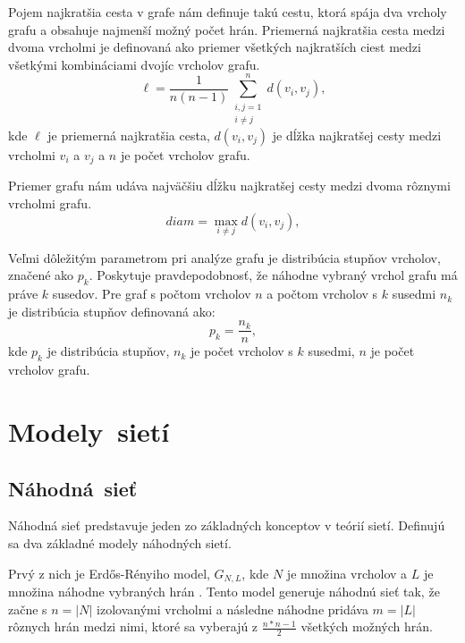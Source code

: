 Pojem najkratšia cesta v grafe nám definuje takú cestu, ktorá spája dva vrcholy grafu a obsahuje najmenší možný počet
hrán. Priemerná najkratšia cesta medzi dvoma vrcholmi je definovaná ako priemer všetkých najkratších ciest medzi
všetkými kombináciami dvojíc vrcholov grafu.	
\begin{equation}
    \ell = \frac{1}{n(n - 1)} \sum_{\substack{i,j = 1 \\ i \ne j}}^{n} d(v_i, v_j),
    \label{eq:avg_shortest_path}
\end{equation}
kde $\ell$ je priemerná najkratšia cesta, $d(v_i, v_j)$ je dĺžka najkratšej cesty medzi vrcholmi $v_i$ a $v_j$ a $n$ je počet vrcholov grafu\cite{barabasi2016network}.

Priemer grafu nám udáva najväčšiu dĺžku najkratšej cesty medzi dvoma rôznymi vrcholmi grafu.
\begin{equation}
    diam = \max_{i \ne j} d(v_i, v_j),
    \label{eq:diameter}
\end{equation}

Veľmi dôležitým parametrom pri analýze grafu je distribúcia stupňov vrcholov, značené ako $p_k$.
Poskytuje pravdepodobnosť, že náhodne vybraný vrchol grafu má práve $k$ susedov\cite{barabasi2016network}.
Pre graf s počtom vrcholov $n$ a počtom vrcholov s $k$ susedmi $n_k$ je distribúcia stupňov definovaná ako:
\begin{equation}
    p_k = \frac{n_k}{n},
    \label{eq:degree_distribution}
\end{equation}
kde $p_k$ je distribúcia stupňov, $n_k$ je počet vrcholov s $k$ susedmi, $n$ je počet vrcholov grafu.

\section{Modely~sietí}\label{sec:network-models}

\subsection{Náhodná~sieť}\label{sec:random-network}

Náhodná sieť predstavuje jeden zo základných konceptov v teórií sietí. Definujú sa dva základné modely náhodných sietí.

Prvý z nich je Erdős-Rényiho model, $G_{N,L}$, kde $N$ je množina vrcholov a $L$ je množina náhodne vybraných hrán \cite{erdos1959random}\cite{barabasi2016network}.
Tento model generuje náhodnú sieť tak, že začne s $n = |N|$ izolovanými vrcholmi a následne náhodne pridáva $m = |L|$ rôznych hrán medzi nimi,
ktoré sa vyberajú z $\frac{n*n-1}{2}$ všetkých možných hrán.

